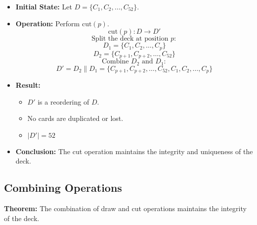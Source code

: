 \documentclass{article}
\begin{document}
\begin{itemize}
    \item \textbf{Initial State:} Let \( D = \{C_1, C_2, \ldots, C_{52}\} \).

    \item \textbf{Operation:} Perform \( \text{cut}(p) \).
    \[
    \text{cut}(p) : D \rightarrow D'
    \]
    \[
    \text{Split the deck at position } p:
    \]
    \[
    D_1 = \{C_1, C_2, \ldots, C_p\}
    \]
    \[
    D_2 = \{C_{p+1}, C_{p+2}, \ldots, C_{52}\}
    \]
    \[
    \text{Combine } D_2 \text{ and } D_1:
    \]
    \[
    D' = D_2 \| D_1 = \{C_{p+1}, C_{p+2}, \ldots, C_{52}, C_1, C_2, \ldots, C_p\}
    \]

    \item \textbf{Result:}
    \begin{itemize}
        \item \( D' \) is a reordering of \( D \).
        \item No cards are duplicated or lost.
        \item \( |D'| = 52 \)
    \end{itemize}

    \item \textbf{Conclusion:} The cut operation maintains the integrity and uniqueness of the deck.
\end{itemize}

\subsection*{Combining Operations}

\textbf{Theorem:} The combination of draw and cut operations maintains the integrity of the deck.
\end{document}
